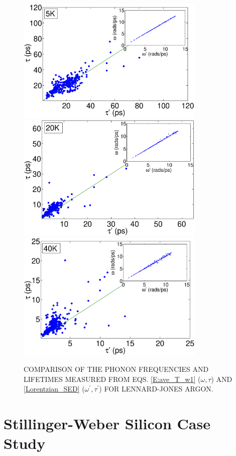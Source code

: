 \documentclass[twocolumn,10pt]{asme2e}
\begin{document}
\begin{figure}
\begin{center}
\includegraphics[angle=0,width=90.0mm]{LJ_NMD_SED_5K.eps}
\includegraphics[angle=0,width=90.0mm]{LJ_NMD_SED_20K.eps}
\includegraphics[angle=0,width=90.0mm]{LJ_NMD_SED_40K.eps}
\end{center}
\caption{\label{F:FREQ_LIFE_LJ} COMPARISON OF THE PHONON FREQUENCIES AND LIFETIMES MEASURED FROM EQS$.$ \eqref{E:ave_T_w1} ($\omega,\tau$) AND \eqref{Lorentzian_SED} ($\omega^{'},\tau^{'}$) FOR LENNARD-JONES ARGON.}
\vspace*{-5mm}
\end{figure}

\section*{Stillinger-Weber Silicon Case Study}\label{S:Si_Case_study}
\end{document}
